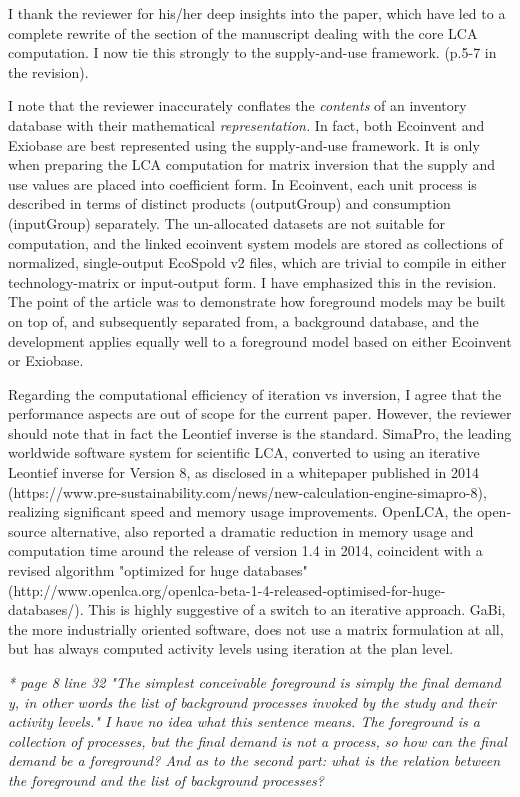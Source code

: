 \documentclass[11pt,letterpaper]{article}
\begin{document}
I thank the reviewer for his/her deep insights into the paper, which have led to a complete rewrite of the section of the manuscript dealing with the core LCA computation.  I now tie this strongly to the supply-and-use framework. (p.5-7 in the revision).

I note that the reviewer inaccurately conflates the \textit{contents} of an inventory database with their mathematical \textit{representation.}  In fact, both Ecoinvent and Exiobase are best represented using the supply-and-use framework.  It is only when preparing the LCA computation for matrix inversion that the supply and use values are placed into coefficient form.  In Ecoinvent, each unit process is described in terms of distinct products (outputGroup) and consumption (inputGroup) separately.  The un-allocated datasets are not suitable for computation, and the linked ecoinvent system models are stored as collections of normalized, single-output EcoSpold v2 files, which are trivial to compile in either technology-matrix or input-output form.  I have emphasized this in the revision.  The point of the article was to demonstrate how foreground models may be built on top of, and subsequently separated from, a background database, and the development applies equally well to a foreground model based on either Ecoinvent or Exiobase.  

Regarding the computational efficiency of iteration vs inversion, I agree that the performance aspects are out of scope for the current paper.  However, the reviewer should note that in fact the Leontief inverse is the standard.  SimaPro, the leading worldwide software system for scientific LCA, converted to using an iterative Leontief inverse for Version 8, as disclosed in a whitepaper published in 2014 (https://www.pre-sustainability.com/news/new-calculation-engine-simapro-8), realizing significant speed and memory usage improvements.  OpenLCA, the open-source alternative, also reported a dramatic reduction in memory usage and computation time around the release of version 1.4 in 2014, coincident with a revised algorithm "optimized for huge databases" (http://www.openlca.org/openlca-beta-1-4-released-optimised-for-huge-databases/). This is highly suggestive of a switch to an iterative approach.  GaBi, the more industrially oriented software, does not use a matrix formulation at all, but has always computed activity levels using iteration at the plan level.  

\emph{* page 8 line 32 "The simplest conceivable foreground is simply the final demand y, in other words the list of background processes invoked by the study and their activity levels." I have no idea what this sentence means. The foreground is a collection of processes, but the final demand is not a process, so how can the final demand be a foreground? And as to the second part: what is the relation between the foreground and the list of background processes?}
\end{document}
